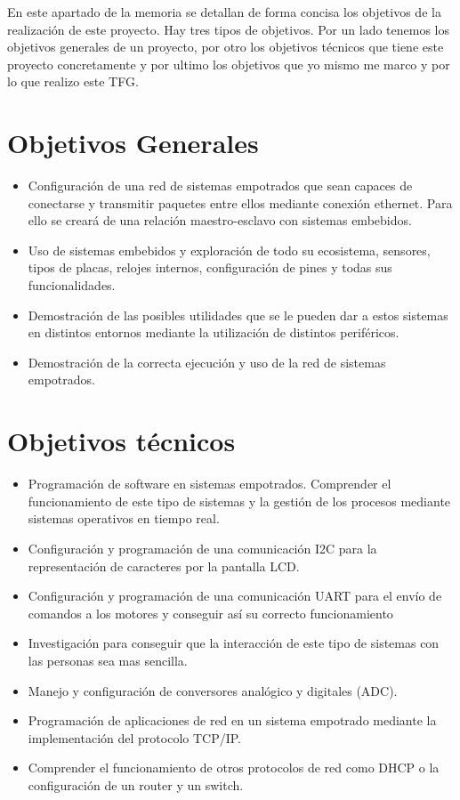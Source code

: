 
En este apartado de la memoria se detallan de forma concisa los objetivos de la realización de este proyecto. Hay tres tipos de objetivos. Por un lado tenemos los objetivos generales de un proyecto, por otro los objetivos técnicos que tiene este proyecto concretamente y por ultimo los objetivos que yo mismo me marco y por lo que realizo este TFG.

\section{Objetivos Generales}\label{sec:OGenerales}
\begin{itemize}	
		\item Configuración de una red de sistemas empotrados que sean capaces de conectarse y transmitir paquetes entre ellos mediante conexión ethernet. Para ello se creará de una relación maestro-esclavo con sistemas embebidos.
		\item Uso de sistemas embebidos y exploración de todo su ecosistema, sensores, tipos de placas, relojes internos, configuración de pines y todas sus funcionalidades.
		\item Demostración de las posibles utilidades que se le pueden dar a estos sistemas en distintos entornos mediante la utilización de distintos periféricos.
		\item Demostración de la correcta ejecución y uso de la red de sistemas empotrados.
\end{itemize}
	
\section{Objetivos técnicos}\label{sec:OTecnicos}
\begin{itemize}
	\item Programación de software en sistemas empotrados. Comprender el funcionamiento de este tipo de sistemas y la gestión de los procesos mediante sistemas operativos en tiempo real.
	\item Configuración y programación de una comunicación I2C para la representación de caracteres por la pantalla LCD.
	\item Configuración y programación de una comunicación UART para el envío de comandos a los motores y conseguir así su correcto funcionamiento
	\item Investigación para conseguir que la interacción de este tipo de sistemas con las personas sea mas sencilla.
	\item Manejo y configuración de conversores analógico y digitales (ADC).
	\item Programación de aplicaciones de red en un sistema empotrado mediante la implementación del protocolo TCP/IP. 
	\item Comprender el funcionamiento de otros protocolos de red como DHCP o la configuración de un router y un switch.
\end{itemize}
			
